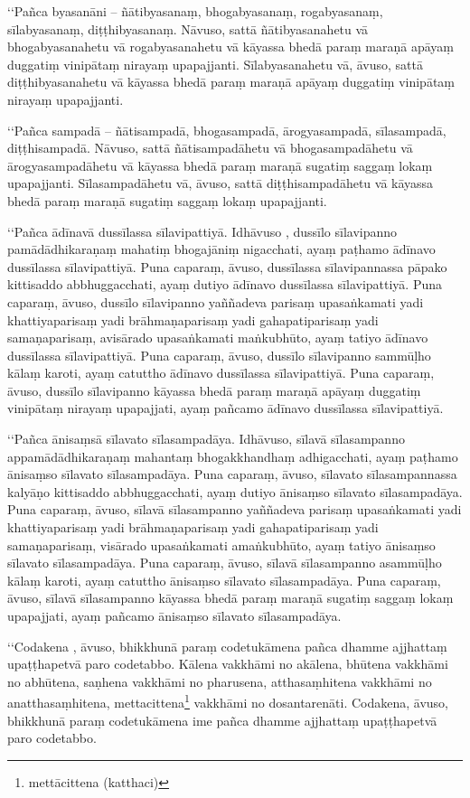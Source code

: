 ‘‘Pañca byasanāni – ñātibyasanaṃ, bhogabyasanaṃ, rogabyasanaṃ, sīlabyasanaṃ, diṭṭhibyasanaṃ. Nāvuso, sattā ñātibyasanahetu vā bhogabyasanahetu vā rogabyasanahetu vā kāyassa bhedā paraṃ maraṇā apāyaṃ duggatiṃ vinipātaṃ nirayaṃ upapajjanti. Sīlabyasanahetu vā, āvuso, sattā diṭṭhibyasanahetu vā kāyassa bhedā paraṃ maraṇā apāyaṃ duggatiṃ vinipātaṃ nirayaṃ upapajjanti.

‘‘Pañca sampadā – ñātisampadā, bhogasampadā, ārogyasampadā, sīlasampadā, diṭṭhisampadā. Nāvuso, sattā ñātisampadāhetu vā bhogasampadāhetu vā ārogyasampadāhetu vā kāyassa bhedā paraṃ maraṇā sugatiṃ saggaṃ lokaṃ upapajjanti. Sīlasampadāhetu vā, āvuso, sattā diṭṭhisampadāhetu vā kāyassa bhedā paraṃ maraṇā sugatiṃ saggaṃ lokaṃ upapajjanti.

‘‘Pañca ādīnavā dussīlassa sīlavipattiyā. Idhāvuso , dussīlo sīlavipanno pamādādhikaraṇaṃ mahatiṃ bhogajāniṃ nigacchati, ayaṃ paṭhamo ādīnavo dussīlassa sīlavipattiyā. Puna caparaṃ, āvuso, dussīlassa sīlavipannassa pāpako kittisaddo abbhuggacchati, ayaṃ dutiyo ādīnavo dussīlassa sīlavipattiyā. Puna caparaṃ, āvuso, dussīlo sīlavipanno yaññadeva parisaṃ upasaṅkamati yadi khattiyaparisaṃ yadi brāhmaṇaparisaṃ yadi gahapatiparisaṃ yadi samaṇaparisaṃ, avisārado upasaṅkamati maṅkubhūto, ayaṃ tatiyo ādīnavo dussīlassa sīlavipattiyā. Puna caparaṃ, āvuso, dussīlo sīlavipanno sammūḷho kālaṃ karoti, ayaṃ catuttho ādīnavo dussīlassa sīlavipattiyā. Puna caparaṃ, āvuso, dussīlo sīlavipanno kāyassa bhedā paraṃ maraṇā apāyaṃ duggatiṃ vinipātaṃ nirayaṃ upapajjati, ayaṃ pañcamo ādīnavo dussīlassa sīlavipattiyā.

‘‘Pañca ānisaṃsā sīlavato sīlasampadāya. Idhāvuso, sīlavā sīlasampanno appamādādhikaraṇaṃ mahantaṃ bhogakkhandhaṃ adhigacchati, ayaṃ paṭhamo ānisaṃso sīlavato sīlasampadāya. Puna caparaṃ, āvuso, sīlavato sīlasampannassa kalyāṇo kittisaddo abbhuggacchati, ayaṃ dutiyo ānisaṃso sīlavato sīlasampadāya. Puna caparaṃ, āvuso, sīlavā sīlasampanno yaññadeva parisaṃ upasaṅkamati yadi khattiyaparisaṃ yadi brāhmaṇaparisaṃ yadi gahapatiparisaṃ yadi samaṇaparisaṃ, visārado upasaṅkamati amaṅkubhūto, ayaṃ tatiyo ānisaṃso sīlavato sīlasampadāya. Puna caparaṃ, āvuso, sīlavā sīlasampanno asammūḷho kālaṃ karoti, ayaṃ catuttho ānisaṃso sīlavato sīlasampadāya. Puna caparaṃ, āvuso, sīlavā sīlasampanno kāyassa bhedā paraṃ maraṇā sugatiṃ saggaṃ lokaṃ upapajjati, ayaṃ pañcamo ānisaṃso sīlavato sīlasampadāya.

‘‘Codakena , āvuso, bhikkhunā paraṃ codetukāmena pañca dhamme ajjhattaṃ upaṭṭhapetvā paro codetabbo. Kālena vakkhāmi no akālena, bhūtena vakkhāmi no abhūtena, saṇhena vakkhāmi no pharusena, atthasaṃhitena vakkhāmi no anatthasaṃhitena, mettacittena\footnote{mettācittena (katthaci)} vakkhāmi no dosantarenāti. Codakena, āvuso, bhikkhunā paraṃ codetukāmena ime pañca dhamme ajjhattaṃ upaṭṭhapetvā paro codetabbo.

